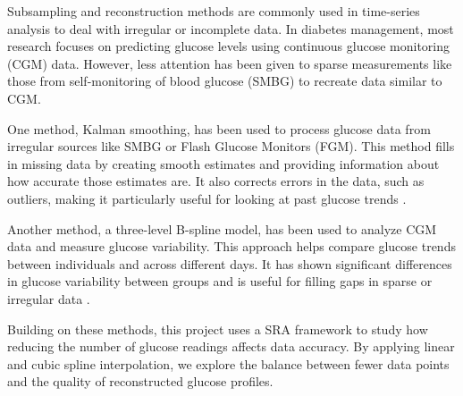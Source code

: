 Subsampling and reconstruction methods are commonly used in time-series analysis to deal with irregular or incomplete data. In diabetes management, most research focuses on predicting glucose levels using continuous glucose monitoring (CGM) data. However, less attention has been given to sparse measurements like those from self-monitoring of blood glucose (SMBG) to recreate data similar to CGM.

One method, Kalman smoothing, has been used to process glucose data from irregular sources like SMBG or Flash Glucose Monitors (FGM). This method fills in missing data by creating smooth estimates and providing information about how accurate those estimates are. It also corrects errors in the data, such as outliers, making it particularly useful for looking at past glucose trends \cite{Staal2019}.

Another method, a three-level B-spline model, has been used to analyze CGM data and measure glucose variability. This approach helps compare glucose trends between individuals and across different days. It has shown significant differences in glucose variability between groups and is useful for filling gaps in sparse or irregular data \cite{Zheng2011}.

Building on these methods, this project uses a SRA framework to study how reducing the number of glucose readings affects data accuracy. By applying linear and cubic spline interpolation, we explore the balance between fewer data points and the quality of reconstructed glucose profiles.

